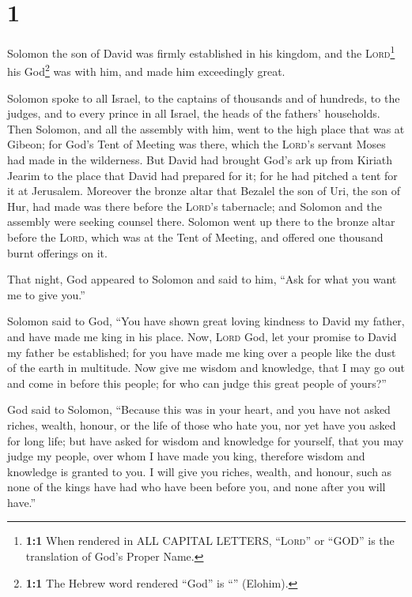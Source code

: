 \hypertarget{section}{%
\section{1}\label{section}}

 Solomon the son of David was firmly established in his
kingdom, and the \textsc{Lord}\footnote{\textbf{1:1} When rendered in
  ALL CAPITAL LETTERS, ``\textsc{Lord}'' or ``GOD'' is the translation
  of God's Proper Name.} his God\footnote{\textbf{1:1} The Hebrew word
  rendered ``God'' is ``'' (Elohim).} was with him, and
made him exceedingly great.

 Solomon spoke to all Israel, to the captains of thousands
and of hundreds, to the judges, and to every prince in all Israel, the
heads of the fathers' households.  Then Solomon, and all
the assembly with him, went to the high place that was at Gibeon; for
God's Tent of Meeting was there, which the \textsc{Lord}'s servant Moses
had made in the wilderness.  But David had brought God's
ark up from Kiriath Jearim to the place that David had prepared for it;
for he had pitched a tent for it at Jerusalem.  Moreover
the bronze altar that Bezalel the son of Uri, the son of Hur, had made
was there before the \textsc{Lord}'s tabernacle; and Solomon and the
assembly were seeking counsel there.  Solomon went up
there to the bronze altar before the \textsc{Lord}, which was at the
Tent of Meeting, and offered one thousand burnt offerings on it.

 That night, God appeared to Solomon and said to him,
``Ask for what you want me to give you.''

 Solomon said to God, ``You have shown great loving
kindness to David my father, and have made me king in his place.
 Now, \textsc{Lord} God, let your promise to David my
father be established; for you have made me king over a people like the
dust of the earth in multitude.  Now give me wisdom and
knowledge, that I may go out and come in before this people; for who can
judge this great people of yours?''

 God said to Solomon, ``Because this was in your heart,
and you have not asked riches, wealth, honour, or the life of those who
hate you, nor yet have you asked for long life; but have asked for
wisdom and knowledge for yourself, that you may judge my people, over
whom I have made you king,  therefore wisdom and
knowledge is granted to you. I will give you riches, wealth, and honour,
such as none of the kings have had who have been before you, and none
after you will have.''

